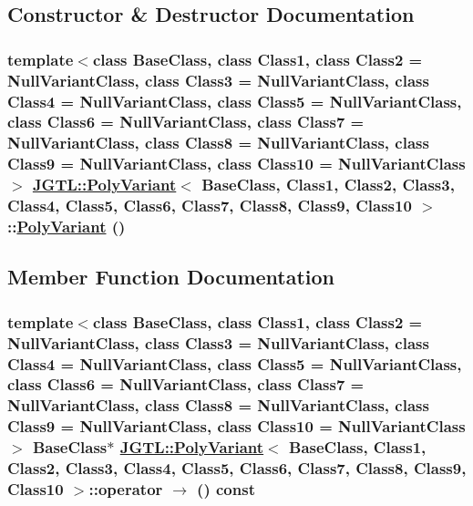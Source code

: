 \subsection{Constructor \& Destructor Documentation}
\hypertarget{class_j_g_t_l_1_1_poly_variant_cf2f8c79c9a93f0070cfba77cfa43d58}{
\subsubsection[PolyVariant]{\setlength{\rightskip}{0pt plus 5cm}template$<$class Base\-Class, class Class1, class Class2 = Null\-Variant\-Class, class Class3 = Null\-Variant\-Class, class Class4 = Null\-Variant\-Class, class Class5 = Null\-Variant\-Class, class Class6 = Null\-Variant\-Class, class Class7 = Null\-Variant\-Class, class Class8 = Null\-Variant\-Class, class Class9 = Null\-Variant\-Class, class Class10 = Null\-Variant\-Class$>$ \hyperlink{class_j_g_t_l_1_1_poly_variant}{JGTL::Poly\-Variant}$<$ Base\-Class, Class1, Class2, Class3, Class4, Class5, Class6, Class7, Class8, Class9, Class10 $>$::\hyperlink{class_j_g_t_l_1_1_poly_variant}{Poly\-Variant} ()}}
\label{class_j_g_t_l_1_1_poly_variant_cf2f8c79c9a93f0070cfba77cfa43d58}




\subsection{Member Function Documentation}
\hypertarget{class_j_g_t_l_1_1_poly_variant_cee1586dc24e7836fc0cf19f9ffc5bd7}{
\subsubsection[operator-$>$]{\setlength{\rightskip}{0pt plus 5cm}template$<$class Base\-Class, class Class1, class Class2 = Null\-Variant\-Class, class Class3 = Null\-Variant\-Class, class Class4 = Null\-Variant\-Class, class Class5 = Null\-Variant\-Class, class Class6 = Null\-Variant\-Class, class Class7 = Null\-Variant\-Class, class Class8 = Null\-Variant\-Class, class Class9 = Null\-Variant\-Class, class Class10 = Null\-Variant\-Class$>$ Base\-Class$\ast$ \hyperlink{class_j_g_t_l_1_1_poly_variant}{JGTL::Poly\-Variant}$<$ Base\-Class, Class1, Class2, Class3, Class4, Class5, Class6, Class7, Class8, Class9, Class10 $>$::operator $\rightarrow$  () const}}
\label{class_j_g_t_l_1_1_poly_variant_cee1586dc24e7836fc0cf19f9ffc5bd7}




